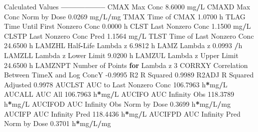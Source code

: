 \documentclass[12pt,]{krantz}
\newenvironment{Shaded}{\begin{snugshade}}{\end{snugshade}}
\newcommand{\ControlFlowTok}[1]{\textcolor[rgb]{0.13,0.29,0.53}{\textbf{#1}}}
\newcommand{\DecValTok}[1]{\textcolor[rgb]{0.00,0.00,0.81}{#1}}
\newcommand{\FloatTok}[1]{\textcolor[rgb]{0.00,0.00,0.81}{#1}}
\newcommand{\NormalTok}[1]{#1}
\newcommand{\OperatorTok}[1]{\textcolor[rgb]{0.81,0.36,0.00}{\textbf{#1}}}
\begin{document}
\begin{Shaded}
\begin{Highlighting}[]
{{{{{{{{{{{{{{{{{{{{{{{{\NormalTok{Calculated Values}
\OperatorTok{-----------------}
\NormalTok{CMAX       Max Conc                                        }\FloatTok{8.6000}\NormalTok{ mg}\OperatorTok{/}\NormalTok{L}
\NormalTok{CMAXD      Max Conc Norm by Dose                           }\FloatTok{0.0269}\NormalTok{ mg}\OperatorTok{/}\NormalTok{L}\OperatorTok{/}\NormalTok{mg}
\NormalTok{TMAX       Time of CMAX                                    }\FloatTok{1.0700}\NormalTok{ h}
\NormalTok{TLAG       Time Until First Nonzero Conc                   }\FloatTok{0.0000}\NormalTok{ h}
\NormalTok{CLST       Last Nonzero Conc                               }\FloatTok{1.1500}\NormalTok{ mg}\OperatorTok{/}\NormalTok{L}
\NormalTok{CLSTP      Last Nonzero Conc Pred                          }\FloatTok{1.1564}\NormalTok{ mg}\OperatorTok{/}\NormalTok{L}
\NormalTok{TLST       Time of Last Nonzero Conc                      }\FloatTok{24.6500}\NormalTok{ h}
\NormalTok{LAMZHL     Half}\OperatorTok{-}\NormalTok{Life Lambda z                              }\FloatTok{6.9812}\NormalTok{ h}
\NormalTok{LAMZ       Lambda z                                        }\FloatTok{0.0993} \OperatorTok{/}\NormalTok{h}
\NormalTok{LAMZLL     Lambda z Lower Limit                            }\FloatTok{9.0200}\NormalTok{ h}
\NormalTok{LAMZUL     Lambda z Upper Limit                           }\FloatTok{24.6500}\NormalTok{ h}
\NormalTok{LAMZNPT    Number of Points }\ControlFlowTok{for}\NormalTok{ Lambda z                   }\DecValTok{3}
\NormalTok{CORRXY     Correlation Between TimeX and Log ConcY        }\FloatTok{-0.9995} 
\NormalTok{R2         R Squared                                       }\FloatTok{0.9989} 
\NormalTok{R2ADJ      R Squared Adjusted                              }\FloatTok{0.9978} 
\NormalTok{AUCLST     AUC to Last Nonzero Conc                      }\FloatTok{106.7963}\NormalTok{ h}\OperatorTok{*}\NormalTok{mg}\OperatorTok{/}\NormalTok{L}
\NormalTok{AUCALL     AUC All                                       }\FloatTok{106.7963}\NormalTok{ h}\OperatorTok{*}\NormalTok{mg}\OperatorTok{/}\NormalTok{L}
\NormalTok{AUCIFO     AUC Infinity Obs                              }\FloatTok{118.3789}\NormalTok{ h}\OperatorTok{*}\NormalTok{mg}\OperatorTok{/}\NormalTok{L}
\NormalTok{AUCIFOD    AUC Infinity Obs Norm by Dose                   }\FloatTok{0.3699}\NormalTok{ h}\OperatorTok{*}\NormalTok{mg}\OperatorTok{/}\NormalTok{L}\OperatorTok{/}\NormalTok{mg}
\NormalTok{AUCIFP     AUC Infinity Pred                             }\FloatTok{118.4436}\NormalTok{ h}\OperatorTok{*}\NormalTok{mg}\OperatorTok{/}\NormalTok{L}
\NormalTok{AUCIFPD    AUC Infinity Pred Norm by Dose                  }\FloatTok{0.3701}\NormalTok{ h}\OperatorTok{*}\NormalTok{mg}\OperatorTok{/}\NormalTok{L}\OperatorTok{/}\NormalTok{mg}
}}}}}}}}}}}}}}}}}}}}}}}}
\end{Highlighting}
\end{Shaded}
\end{document}
